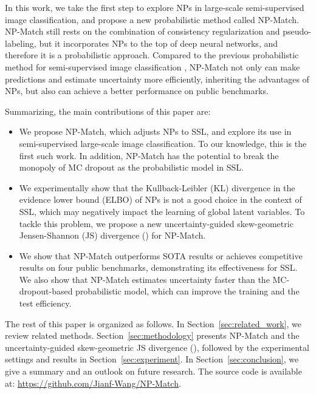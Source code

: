 \documentclass[nohyperref]{article}
\theoremstyle{plain}
\theoremstyle{definition}
\theoremstyle{remark}
\begin{document}
In this work, we take the first step to explore NPs in large-scale semi-supervised image classification, and propose a new probabilistic method called NP-Match. NP-Match still rests on the combination of consistency regularization and pseudo-labeling, but it incorporates NPs to the top of deep neural networks, and therefore it is a probabilistic approach. Compared to the previous probabilistic method for semi-supervised image classification \cite{rizve2021defense}, NP-Match not only can make predictions and estimate uncertainty more efficiently,  inheriting the advantages of NPs, but also can achieve a better performance on public benchmarks. 

Summarizing, the main contributions of this paper are:\vspace*{-1ex}
\begin{itemize}[leftmargin=*, itemsep=0.5pt]
\item We propose NP-Match, which adjusts NPs to SSL, and explore its use in semi-supervised large-scale image classification. To our knowledge, this is the first such work. In addition, NP-Match has the potential to break the monopoly of MC dropout as the probabilistic model in SSL. 

\item We experimentally show that the Kullback-Leibler (KL) divergence in the evidence lower bound (ELBO) of NPs \cite{garnelo2018neural} is not a good choice in the context of SSL, which may negatively impact the learning of global latent variables. To tackle this problem, we propose a new uncertainty-guided skew-geometric Jensen-Shannon (JS) divergence () for NP-Match. 

\item We show that NP-Match outperforms SOTA results or achieves competitive results on four public benchmarks, demonstrating its effectiveness for SSL. We also  show that NP-Match estimates uncertainty faster than the MC-dropout-based probabilistic model, which can improve the training and the test efficiency.  
\end{itemize}

The rest of this paper is organized as follows. In Section~\ref{sec:related_work}, we review related methods. Section~\ref{sec:methodology} presents NP-Match and the uncertainty-guided skew-geometric JS divergence (),  followed by the experimental settings and results in Section~\ref{sec:experiment}. In Section~\ref{sec:conclusion}, we give a summary and an outlook on future research. The source code is available at: \href{https://github.com/Jianf-Wang/NP-Match}{https://github.com/Jianf-Wang/NP-Match}.
\end{document}
